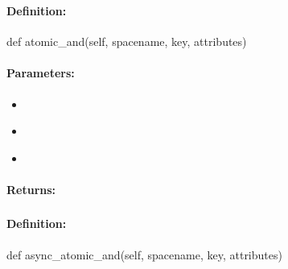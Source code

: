 \subsubsection{}
\label{api:python:atomic_and}


\paragraph{Definition:}
\begin{pythoncode}
def atomic_and(self, spacename, key, attributes)
\end{pythoncode}

\paragraph{Parameters:}
\begin{itemize}[noitemsep]
\item {}\\

\item {}\\

\item {}\\

\end{itemize}

\paragraph{Returns:}


\pagebreak
\subsubsection{}
\label{api:python:async_atomic_and}


\paragraph{Definition:}
\begin{pythoncode}
def async_atomic_and(self, spacename, key, attributes)
\end{pythoncode}


